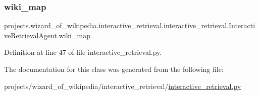 \subsubsection{\texorpdfstring{wiki\+\_\+map}{wiki\_map}}
{\footnotesize\ttfamily projects.\+wizard\+\_\+of\+\_\+wikipedia.\+interactive\+\_\+retrieval.\+interactive\+\_\+retrieval.\+Interactive\+Retrieval\+Agent.\+wiki\+\_\+map}



Definition at line 47 of file interactive\+\_\+retrieval.\+py.



The documentation for this class was generated from the following file\+:\begin{DoxyCompactItemize}
\item 
projects/wizard\+\_\+of\+\_\+wikipedia/interactive\+\_\+retrieval/\hyperlink{interactive__retrieval_8py}{interactive\+\_\+retrieval.\+py}\end{DoxyCompactItemize}
